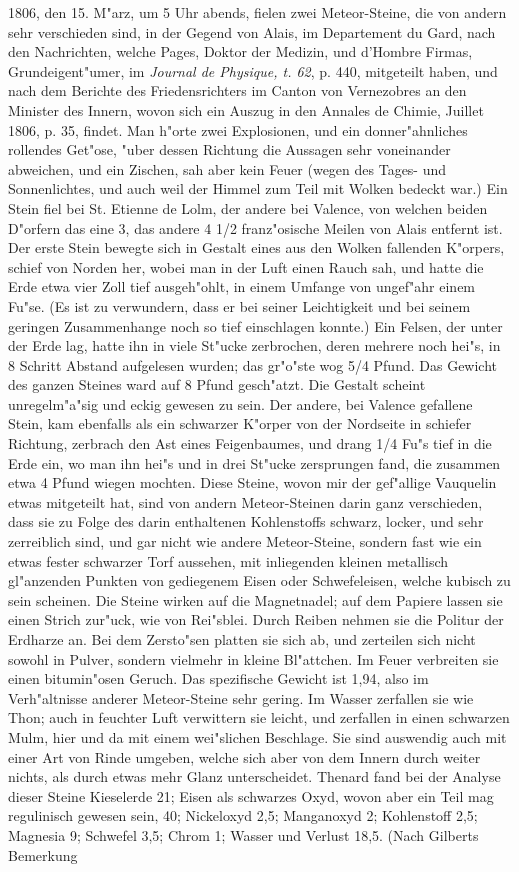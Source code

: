 \documentclass[a4paper, 11pt, oneside, polutonikogreek, german]{article}
\begin{document}
1806, den 15. M"arz, um 5 Uhr abends, fielen zwei Meteor-Steine, die von andern sehr verschieden sind, in der Gegend von Alais, im Departement du Gard, nach den Nachrichten, welche Pages, Doktor der Medizin, und d'Hombre Firmas, Grundeigent"umer, im \emph{Journal de Physique, t. 62}, p. 440, mitgeteilt haben, und nach dem Berichte des Friedensrichters im Canton von Vernezobres an den Minister des Innern, wovon sich ein Auszug in den Annales de Chimie, Juillet 1806, p. 35, findet. Man h"orte zwei Explosionen, und ein donner"ahnliches rollendes Get"ose, "uber dessen Richtung die Aussagen sehr voneinander abweichen, und ein Zischen, sah aber kein Feuer (wegen des Tages- und Sonnenlichtes, und auch weil der Himmel zum Teil mit Wolken bedeckt war.) Ein Stein fiel bei St. Etienne de Lolm, der andere bei Valence, von welchen beiden D"orfern das eine 3, das andere 4 1/2 franz"osische Meilen von Alais entfernt ist. Der erste Stein bewegte sich in Gestalt eines aus den Wolken fallenden K"orpers, schief von Norden her, wobei man in der Luft einen Rauch sah, und hatte die Erde etwa vier Zoll tief ausgeh"ohlt, in einem Umfange von ungef"ahr einem Fu"se. (Es ist zu verwundern, dass er bei seiner Leichtigkeit und bei seinem geringen Zusammenhange noch so tief einschlagen konnte.) Ein Felsen, der unter der Erde lag, hatte ihn in viele St"ucke zerbrochen, deren mehrere noch hei"s, in 8 Schritt Abstand aufgelesen wurden; das gr"o"ste wog 5/4 Pfund. Das Gewicht des ganzen Steines ward auf 8 Pfund gesch"atzt. Die Gestalt scheint unregelm"a"sig und eckig gewesen zu sein. Der andere, bei Valence gefallene Stein, kam ebenfalls als ein schwarzer K"orper von der Nordseite in schiefer Richtung, zerbrach den Ast eines Feigenbaumes, und drang 1/4 Fu"s tief in die Erde ein, wo man ihn hei"s und in drei St"ucke zersprungen fand, die zusammen etwa 4 Pfund wiegen mochten. Diese Steine, wovon mir der gef"allige Vauquelin etwas mitgeteilt hat, sind von andern Meteor-Steinen darin ganz verschieden, dass sie zu Folge des darin enthaltenen Kohlenstoffs schwarz, locker, und sehr zerreiblich sind, und gar nicht wie andere Meteor-Steine, sondern fast wie ein etwas fester schwarzer Torf aussehen, mit inliegenden kleinen metallisch gl"anzenden Punkten von gediegenem Eisen oder Schwefeleisen, welche kubisch zu sein scheinen. Die Steine wirken auf die Magnetnadel; auf dem Papiere lassen sie einen Strich zur"uck, wie von Rei"sblei. Durch Reiben nehmen sie die Politur der Erdharze an. Bei dem Zersto"sen platten sie sich ab, und zerteilen sich nicht sowohl in Pulver, sondern vielmehr in kleine Bl"attchen. Im Feuer verbreiten sie einen bitumin"osen Geruch. Das spezifische Gewicht ist 1,94, also im Verh"altnisse anderer Meteor-Steine sehr gering. Im Wasser zerfallen sie wie Thon; auch in feuchter Luft verwittern sie leicht, und zerfallen in einen schwarzen Mulm, hier und da mit einem wei"slichen Beschlage. Sie sind auswendig auch mit einer Art von Rinde umgeben, welche sich aber von dem Innern durch weiter nichts, als durch etwas mehr Glanz unterscheidet. Thenard fand bei der Analyse dieser Steine Kieselerde 21; Eisen als schwarzes Oxyd, wovon aber ein Teil mag regulinisch gewesen sein, 40; Nickeloxyd 2,5; Manganoxyd 2; Kohlenstoff 2,5; Magnesia 9; Schwefel 3,5; Chrom 1; Wasser und Verlust 18,5. (Nach Gilberts Bemerkung 
\end{document}
